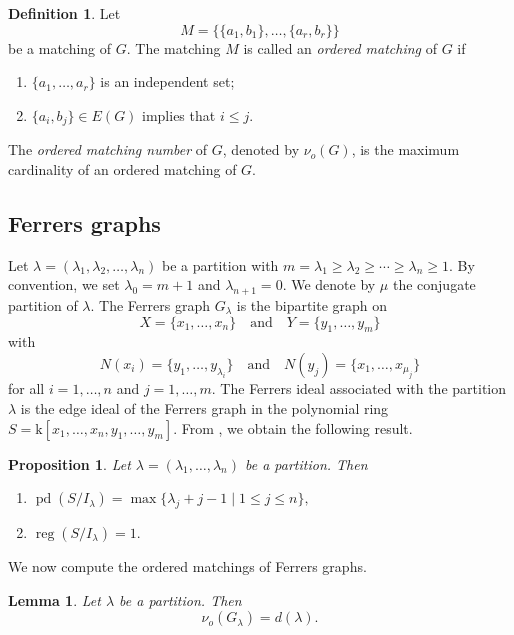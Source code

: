 \documentclass[12pt,amscd]{amsart}
\newtheorem{lem}[thm]{Lemma}
\newtheorem{prop}[thm]{Proposition}
\theoremstyle{definition}
\newtheorem{defn}[thm]{Definition}
\numberwithin{equation}{section}
\DeclareMathOperator{\pd}{pd}
\DeclareMathOperator{\reg}{reg}
\def\k {\mathrm{k}}
\begin{document}
\begin{defn}
Let
\[
M = \{ \{ a_1,b_1\}, \ldots, \{a_r,b_r\}\}
\]
be a matching of $G$. The matching $M$ is called an \emph{ordered matching} of $G$ if 
\begin{enumerate}
    \item $\{a_1, \ldots, a_r\}$ is an independent set;
    \item \( \{a_i,b_j\} \in E(G)\) implies that $i \le j$.
\end{enumerate}
The \emph{ordered matching number} of $G$, denoted by $\nu_o(G)$, is the maximum cardinality of an ordered matching of $G$.
\end{defn}

\subsection{Ferrers graphs}\label{subsection_Ferrers} 
Let $\lambda=(\lambda_1,\lambda_2,\ldots,\lambda_n)$ be a partition with
\(m = \lambda_1 \ge \lambda_2 \ge \cdots \ge \lambda_n \ge 1.
\)
By convention, we set $\lambda_0 = m+1$ and $\lambda_{n+1} = 0$. We denote by $\mu$ the conjugate partition of $\lambda$. The Ferrers graph $G_\lambda$ is the bipartite graph on
\[
X = \{x_1, \ldots, x_n\}
\quad \text{and} \quad
Y = \{y_1,\ldots,y_m\}
\]
with
\[
N(x_i) = \{y_1, \ldots, y_{\lambda_i}\}
\quad \text{and} \quad
N(y_j) = \{x_1, \ldots, x_{\mu_j}\}
\]
for all $i = 1, \ldots, n$ and $j = 1, \ldots, m$. The Ferrers ideal associated with the partition $\lambda$ is the edge ideal of the Ferrers graph in the polynomial ring
\(S = \k[x_1,\ldots,x_n,y_1,\ldots,y_m].\) From \cite[Corollary 2.2 and Corollary 2.6]{CN}, we obtain the following result.

\begin{prop}\label{CN_Ilambda} Let $\lambda = (\lambda_1,\ldots,\lambda_n)$ be a partition. Then
\begin{enumerate}
    \item
    \(
    \pd(S/I_{\lambda})
    =
    \max \{\lambda_j + j - 1\mid 1 \le j \le n\},
    \)
    
    \item
    \(
    \reg(S/I_{\lambda}) = 1.
    \)
\end{enumerate}
\end{prop}

We now compute the ordered matchings of Ferrers graphs.

\begin{lem}\label{lem_ordered_Ferrers}
Let $\lambda$ be a partition. Then
\[
\nu_o(G_\lambda) = d(\lambda).
\]
\end{lem}
\end{document}
